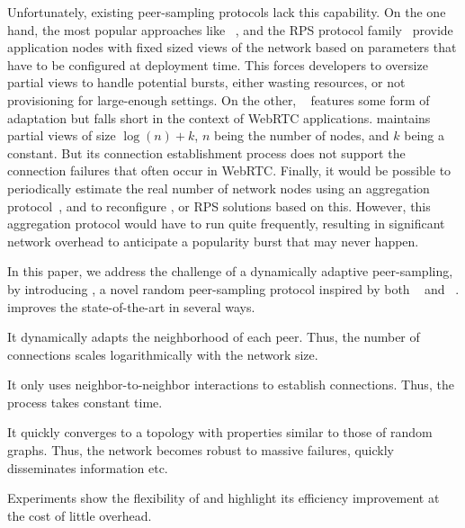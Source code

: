 Unfortunately, existing peer-sampling protocols
lack this capability. On the one hand, the most popular approaches like
\CYCLON~\cite{voulgaris2005cyclon}, and the RPS protocol
family~\cite{jelasity2007gossip} provide application nodes with fixed sized
views of the network based on parameters that have to be configured at
deployment time. This forces developers to oversize partial views to handle
potential bursts, either wasting resources, or not provisioning for large-enough
settings. On the other, \SCAMP~\cite{ganesh2003peer} features some form of
adaptation but falls short in the context of WebRTC applications. \SCAMP
maintains partial views of size $\log(n)+k$, $n$ being the number of nodes, and
$k$ being a constant. But its connection establishment process does not support
the connection failures that often occur in WebRTC.
Finally, it would be possible to periodically estimate the real number
of network nodes using an aggregation
protocol~\cite{montresor2004robust}, and to reconfigure \CYCLON, or RPS
solutions based on this. However, this aggregation protocol would have
to run quite frequently, resulting in significant network overhead
to anticipate a popularity burst that may never happen. 


In this paper, we address the challenge of a dynamically adaptive
peer-sampling, by introducing \SPRAY, a novel random peer-sampling
protocol inspired by both \SCAMP~\cite{ganesh2003peer} and
\CYCLON~\cite{voulgaris2005cyclon}. \SPRAY improves the
state-of-the-art in several ways.
\begin{inparaenum}[(i)]
\item It dynamically adapts the neighborhood of each peer. Thus, the
  number of connections scales logarithmically with the network size.
\item It only uses neighbor-to-neighbor interactions to establish
  connections. Thus, the process takes constant time.
\item It quickly converges to a topology with properties similar to
  those of random graphs. Thus, the network becomes robust to massive
  failures, quickly disseminates information etc.
\item Experiments show the flexibility of \SPRAY and highlight its
  efficiency improvement at the cost of little overhead.
\end{inparaenum}

